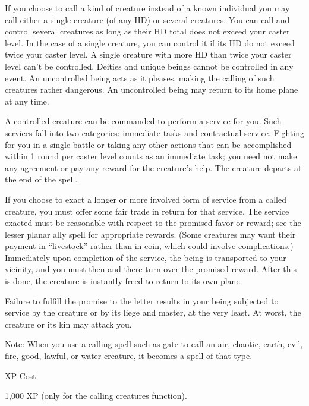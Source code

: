 {	If you choose to call a kind of creature instead of a known individual you may call either a single creature (of any HD) or several creatures. You can call and control several creatures as long as their HD total does not exceed your caster level. In the case of a single creature, you can control it if its HD do not exceed twice your caster level. A single creature with more HD than twice your caster level can't be controlled. Deities and unique beings cannot be controlled in any event. An uncontrolled being acts as it pleases, making the calling of such creatures rather dangerous. An uncontrolled being may return to its home plane at any time.


	A controlled creature can be commanded to perform a service for you. Such services fall into two categories: immediate tasks and contractual service. Fighting for you in a single battle or taking any other actions that can be accomplished within 1 round per caster level counts as an immediate task; you need not make any agreement or pay any reward for the creature's help. The creature departs at the end of the spell.


	If you choose to exact a longer or more involved form of service from a called creature, you must offer some fair trade in return for that service. The service exacted must be reasonable with respect to the promised favor or reward; see the lesser planar ally spell for appropriate rewards. (Some creatures may want their payment in “livestock” rather than in coin, which could involve complications.) Immediately upon completion of the service, the being is transported to your vicinity, and you must then and there turn over the promised reward. After this is done, the creature is instantly freed to return to its own plane.


	Failure to fulfill the promise to the letter results in your being subjected to service by the creature or by its liege and master, at the very least. At worst, the creature or its kin may attack you.


Note: When you use a calling spell such as gate to call an air, chaotic, earth, evil, fire, good, lawful, or water creature, it becomes a spell of that type.

XP Cost

	1,000 XP (only for the calling creatures function).
}
        
